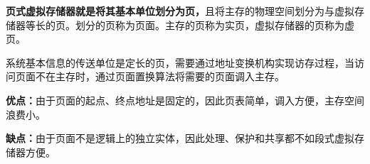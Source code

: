 \textbf{{页式虚拟存储器就是将其基本单位划分为页，}}且将主存的物理空间划分为与虚拟存储器等长的页。划分的页称为页面。主存的页称为实页，虚拟存储器的页称为虚页。

系统基本信息的传送单位是定长的页，需要通过地址变换机构实现访存过程，当访问页面不在主存时，通过页面置换算法将需要的页面调入主存。

\textbf{优点：}由于页面的起点、终点地址是固定的，因此页表简单，调入方便，主存空间浪费小。

\textbf{缺点：}由于页面不是逻辑上的独立实体，因此处理、保护和共享都不如段式虚拟存储器方便。\\
